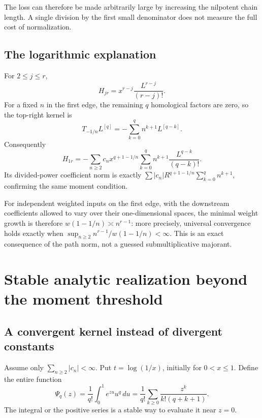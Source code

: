\documentclass[11pt,a4paper]{article}
\numberwithin{equation}{section}
\theoremstyle{definition}
\theoremstyle{remark}
\newcommand{\dplog}[1]{L^{[#1]}}
\begin{document}
The loss can therefore be made arbitrarily large by increasing the
nilpotent chain length. A single division by the first small denominator
does not measure the full cost of normalization.

\subsection{The logarithmic explanation}
For $2\leq j\leq r$,
\[
 H_{jr}=x^{r-j}\frac{L^{r-j}}{(r-j)!}.
\]
For a fixed $n$ in the first edge, the remaining $q$ homological factors
are zero, so the top-right kernel is
\begin{equation}\label{eq:chainQ}
 T_{-1/n}\dplog{q}
       =-\sum_{k=0}^q n^{k+1}\dplog{q-k}.
\end{equation}
Consequently
\begin{equation}\label{eq:chainH}
 H_{1r}=-\sum_{n\geq2}c_nx^{q+1-1/n}
                      \sum_{k=0}^q n^{k+1}\frac{L^{q-k}}{(q-k)!}.
\end{equation}
Its divided-power coefficient norm is exactly
$\sum |c_n|R^{q+1-1/n}\sum_{k=0}^q n^{k+1}$, confirming the same moment
condition.

For independent weighted inputs on the first edge, with the downstream
coefficients allowed to vary over their one-dimensional spaces, the
minimal weight growth is therefore $w(1-1/n)\asymp n^{r-1}$: more precisely,
universal convergence holds exactly when
$\sup_{n\geq2} n^{r-1}/w(1-1/n)<\infty$. This is an exact consequence of
the path norm, not a guessed submultiplicative majorant.

\section{Stable analytic realization beyond the moment threshold}
\label{sec:analytic}

\subsection{A convergent kernel instead of divergent constants}
Assume only $\sum_{n\geq2}|c_n|<\infty$. Put $t=\log(1/x)$, initially
for $0<x\leq1$. Define the entire function
\begin{equation}\label{eq:Psi}
 \Psi_q(z)=\frac1{q!}\int_0^1 e^{zu}u^q\,du
          =\frac1{q!}\sum_{k\geq0}\frac{z^k}{k!(q+k+1)}.
\end{equation}
The integral or the positive series is a stable way to evaluate it near
$z=0$.
\end{document}
